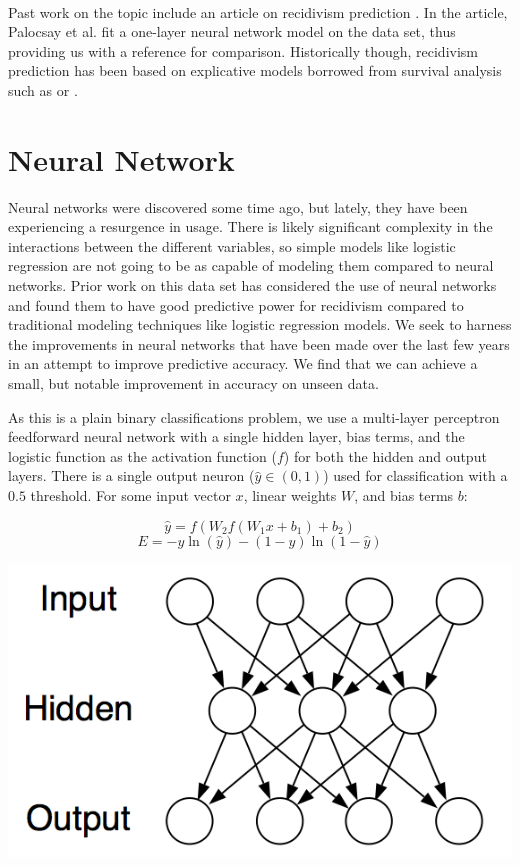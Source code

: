 \documentclass[a0,landscape]{a0poster}
\begin{document}
\begin{multicols}{4}
\paragraph{}
Past work on the topic include an article on recidivism prediction \cite{bib1}. In the article, Palocsay et al. fit a one-layer neural network model on the data set, thus providing us with a reference for comparison. Historically though, recidivism prediction has been based on explicative models borrowed from survival analysis such as \cite{bib2} or \cite{bib3}.


\color{DarkSlateGray} %

\section*{Neural Network}
Neural networks were discovered some time ago, but lately, they have been experiencing a resurgence in usage. There is likely significant complexity in the interactions between the different variables, so simple models like logistic regression are not going to be as capable of modeling them compared to neural networks. Prior work on this data set has considered the use of neural networks and found them to have good predictive power for recidivism compared to traditional modeling techniques like logistic regression models. We seek to harness the improvements in neural networks that have been made over the last few years in an attempt to improve predictive accuracy. We find that we can achieve a small, but notable improvement in accuracy on unseen data.

As this is a plain binary classifications problem, we use a multi-layer perceptron feedforward neural network with a single hidden layer, bias terms, and the logistic function as the activation function ($f$) for both the hidden and output layers. There is a single output neuron ($\hat{y} \in (0, 1)$) used for classification with a $0.5$ threshold. For some input vector $x$, linear weights $W$, and bias terms $b$:

\[ \hat{y} = f( W_2  f( W_1 x + b_1 ) + b_2 ) \]
\[ E = - y \ln( \hat{y} ) - (1 - y) \ln ( 1 - \hat{y} ) \]

\begin{center}\vspace{1cm}
\includegraphics[width=0.8\linewidth]{neural_network}
\end{center}\vspace{1cm}


\end{multicols}
\end{document}
